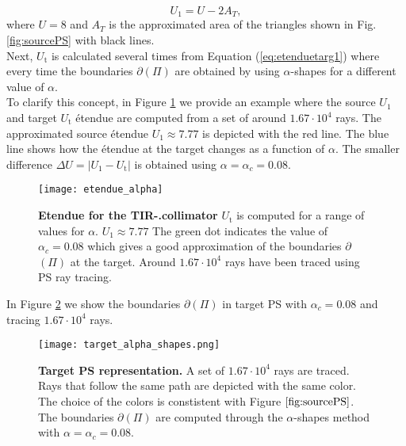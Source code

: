  \begin{equation}\label{eq:Usource}
 U_{1} = U-2A_{T},
 \end{equation}
 where $U=8$ and $A_{T}$ is the approximated area of the triangles shown in Fig. \ref{fig:sourcePS} with black lines.\\ \indent  Next, $U_{\textrm{t}}$ is calculated several times from Equation (\ref{eq:etenduetarg1}) where every time the boundaries $\partial$$(\Pi)$ are obtained by using $\alpha$-shapes for a different value of $\alpha$. 
\\ \indent To clarify this concept, in Figure \ref{fig:etendueTS} we provide an example where the source $U_1$ and target $U_{\textrm{t}}$ \'{e}tendue are computed from a set of around $1.67\cdot 10^4$ rays. The approximated source \'{e}tendue $U_1\approx 7.77$ is depicted with the red line. The blue line shows how the \'{e}tendue at the target changes as a function of $\alpha$. The smaller difference $\Delta U = |U_1-U_{\textrm{t}}|$ is obtained using $\alpha = \alpha_c = 0.08$.
 \begin{figure}[h]
  \begin{center}
  \texttt{[image: etendue\_alpha]}
  \end{center}
  \caption{\textbf{Etendue for the TIR-.collimator}
  $U_\textrm{t}$ is computed for a range of values for $\alpha$. $U_1 \approx 7.77$
   The green dot indicates the value of $\alpha_c = 0.08$ which gives a good approximation of the boundaries $\partial$$(\Pi)$ at the target.
   Around $1.67 \cdot 10^4$ rays have been traced using PS ray tracing.
  }
  \label{fig:etendueTS}
\end{figure}
In Figure \ref{fig:targetPS} we show the boundaries 
$\partial$$(\Pi)$ in target PS  with $\alpha_c=0.08$ and tracing $1.67\cdot10^4$ rays.
  \begin{figure}[h]
  \begin{center}
  \texttt{[image: target\_alpha\_shapes.png]}
  \end{center}
  \caption{\textbf{Target PS representation.} A set of $1.67 \cdot 10^4$ rays are traced.
  Rays that follow the same path are depicted with the same color. The choice of the colors is constistent with Figure $\ref{fig:sourcePS}$. The boundaries $\partial$$(\Pi)$ are computed through the $\alpha$-shapes method with $\alpha = \alpha_c = 0.08$.}
  \label{fig:targetPS}
\end{figure}
